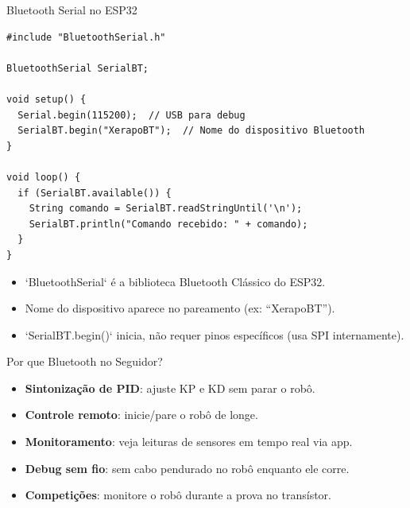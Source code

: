 \documentclass[10pt]{beamer}
\begin{document}
\begin{frame}[fragile]{Bluetooth Serial no ESP32}
\begin{lstlisting}
#include "BluetoothSerial.h"

BluetoothSerial SerialBT;

void setup() {
  Serial.begin(115200);  // USB para debug
  SerialBT.begin("XerapoBT");  // Nome do dispositivo Bluetooth
}

void loop() {
  if (SerialBT.available()) {
    String comando = SerialBT.readStringUntil('\n');
    SerialBT.println("Comando recebido: " + comando);
  }
}
\end{lstlisting}

  \begin{itemize}
    \item `BluetoothSerial` é a biblioteca Bluetooth Clássico do ESP32.
    \item Nome do dispositivo aparece no pareamento (ex: ``XerapoBT'').
    \item `SerialBT.begin()` inicia, não requer pinos específicos (usa SPI internamente).
  \end{itemize}
\end{frame}

\begin{frame}{Por que Bluetooth no Seguidor?}
  \begin{itemize}
    \item \textbf{Sintonização de PID}: ajuste KP e KD sem parar o robô.
    \item \textbf{Controle remoto}: inicie/pare o robô de longe.
    \item \textbf{Monitoramento}: veja leituras de sensores em tempo real via app.
    \item \textbf{Debug sem fio}: sem cabo pendurado no robô enquanto ele corre.
    \item \textbf{Competições}: monitore o robô durante a prova no transístor.
  \end{itemize}
\end{frame}
\end{document}

